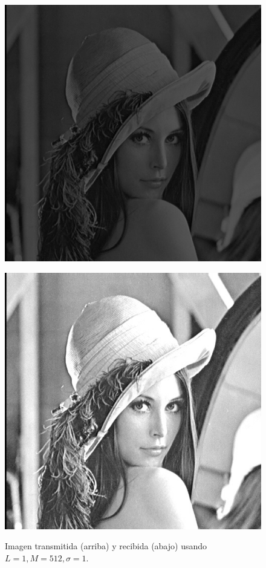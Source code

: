 \documentclass[10pt,journal,compsoc]{IEEEtran}
\begin{document}
\begin{figure}
\begin{center}
\label{fig:refuerzos2}
\centering
\begin{minipage}{.5\textwidth}
  \centering

  \includegraphics[scale=0.25]{../512/1/imgTrans.jpg}
\end{minipage}
\vspace{0cm}
\begin{minipage}{.5\textwidth}
  \centering
  \includegraphics[scale=0.25]{../512/1/imgRec.jpg}
  \label{fig:sub2}
\end{minipage}
\caption{Imagen transmitida (arriba) y recibida (abajo) usando $L=1 , M=512, \sigma=1$.}
\label{fig:test}
\end{center}
\end{figure}
\end{document}
